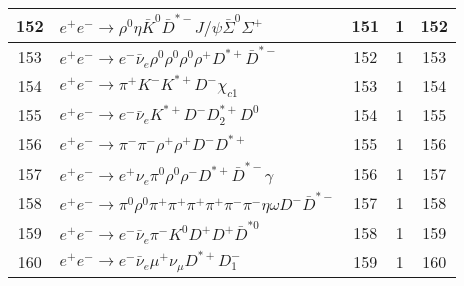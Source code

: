 \documentclass[landscape]{article}
\begin{document}
\begin{table}[htbp!]
\begin{tabular}{|c|>{\centering}p{18cm}|c|c|c|}
\hline
152 & $ e^{+} e^{-} \rightarrow \rho^{0} \eta \bar{K}^{0} \bar{D}^{*-} J/\psi \bar{\Sigma}^{0} \Sigma^{+} $ & 151 & 1 & 152 \\
\hline
153 & $ e^{+} e^{-} \rightarrow e^{-} \bar{\nu}_{e} \rho^{0} \rho^{0} \rho^{0} \rho^{+} D^{*+} \bar{D}^{*-} $ & 152 & 1 & 153 \\
\hline
154 & $ e^{+} e^{-} \rightarrow \pi^{+} K^{-} K^{*+} D^{-} \chi_{c1} $ & 153 & 1 & 154 \\
\hline
155 & $ e^{+} e^{-} \rightarrow e^{-} \bar{\nu}_{e} K^{*+} D^{-} D_{2}^{*+} D^{0} $ & 154 & 1 & 155 \\
\hline
156 & $ e^{+} e^{-} \rightarrow \pi^{-} \pi^{-} \rho^{+} \rho^{+} D^{-} D^{*+} $ & 155 & 1 & 156 \\
\hline
157 & $ e^{+} e^{-} \rightarrow e^{+} \nu_{e} \pi^{0} \rho^{0} \rho^{-} D^{*+} \bar{D}^{*-} \gamma $ & 156 & 1 & 157 \\
\hline
158 & $ e^{+} e^{-} \rightarrow \pi^{0} \rho^{0} \pi^{+} \pi^{+} \pi^{+} \pi^{+} \pi^{-} \pi^{-} \eta \omega D^{-} \bar{D}^{*-} $ & 157 & 1 & 158 \\
\hline
159 & $ e^{+} e^{-} \rightarrow e^{-} \bar{\nu}_{e} \pi^{-} K^{0} D^{+} D^{+} \bar{D}^{*0} $ & 158 & 1 & 159 \\
\hline
160 & $ e^{+} e^{-} \rightarrow e^{-} \bar{\nu}_{e} \mu^{+} \nu_{\mu} D^{*+} D_{1}^{-} $ & 159 & 1 & 160 \\
\hline
\end{tabular}
\end{table}

\clearpage
\end{document}

